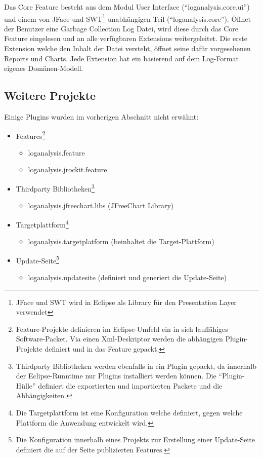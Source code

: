 Das Core Feature besteht aus dem Modul User Interface (``loganalysis.core.ui'') und einem von JFace und SWT\footnote{JFace und SWT wird in Eclipse als Library für den Presentation Layer verwendet} unabhängigen Teil (``loganalysis.core''). Öffnet der Benutzer eine Garbage Collection Log Datei, wird diese durch das Core Feature eingelesen und an alle verfügbaren Extensions weitergeleitet. Die erste Extension welche den Inhalt der Datei versteht, öffnet seine dafür vorgesehenen Reports und Charts. Jede Extension hat ein basierend auf dem Log-Format eigenes Domänen-Modell.

\subsection{Weitere Projekte}
Einige Plugins wurden im vorherigen Abschnitt nicht erwähnt:
\begin{itemize}
	\item Features\footnote{Feature-Projekte definieren im Eclipse-Umfeld ein in sich lauffähiges Software-Packet. Via einen Xml-Deskriptor werden die abhängigen Plugin-Projekte definiert und in das Feature gepackt.}
		\begin{itemize}
			\item loganalysis.feature
			\item loganalysis.jrockit.feature
		\end{itemize}
	\item Thirdparty Bibliotheken\footnote{Thirdparty Bibliotheken werden ebenfalls in ein Plugin gepackt, da innerhalb der Eclipse-Runntime nur Plugins installiert werden können. Die ``Plugin-Hülle'' definiert die exportierten und importierten Packete und die Abhängigkeiten.}
		\begin{itemize}
			\item  loganalysis.jfreechart.libs (JFreeChart Library)
		\end{itemize}
	\item Targetplattform\footnote{Die Targetplattform ist eine Konfiguration welche definiert, gegen welche Plattform die Anwendung entwickelt wird.}
		\begin{itemize}
			\item  loganalysis.targetplatform (beinhaltet die Target-Plattform)
		\end{itemize}
	\item Update-Seite\footnote{Die Konfiguration innerhalb eines Projekts zur Erstellung einer Update-Seite definiert die auf der Seite publizierten Features.}
		\begin{itemize}
			\item loganalysis.updatesite (definiert und generiert die Update-Seite)
		\end{itemize}
\end{itemize}

